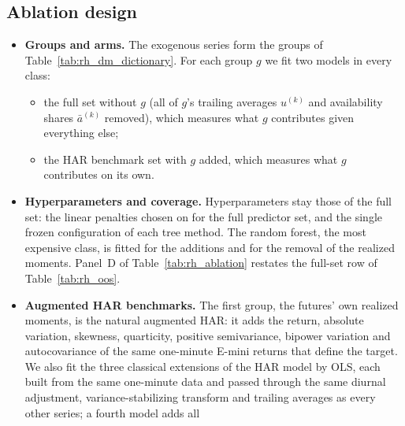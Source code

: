 \subsection{Ablation design}
\label{app:rh_results_ablation}
\begin{itemize}
\item \textbf{Groups and arms.} The \rhdmNSeriesPooled{} exogenous series form the \rhfiNBuckets{} groups of
  Table~\ref{tab:rh_dm_dictionary}. For each group $g$ we fit two models in every class:
  \begin{itemize}
  \item the full set without $g$ (all of $g$'s trailing averages $u^{(k)}$ and availability shares $\bar a^{(k)}$
    removed), which measures what $g$ contributes given everything else;
  \item the HAR benchmark set with $g$ added, which measures what $g$ contributes on its own.
  \end{itemize}
\item \textbf{Hyperparameters and coverage.} Hyperparameters stay those of the full set: the linear penalties chosen on
  \rhorPenSample{} for the full predictor set, and the single frozen configuration of each tree method. The random
  forest, the most expensive class, is fitted for the \rhfiNBuckets{} additions and for the removal of the realized
  moments. Panel~D of Table~\ref{tab:rh_ablation} restates the full-set row of Table~\ref{tab:rh_oos}.
\item \textbf{Augmented HAR benchmarks.} The first group, the futures' own realized moments, is the natural augmented
  HAR: it adds the return, absolute variation, skewness, quarticity, positive semivariance, bipower variation and
  autocovariance of the same one-minute E-mini returns that define the target. We also fit the three classical
  extensions of the HAR model by OLS, each built from the same one-minute data and passed through the same diurnal
  adjustment, variance-stabilizing transform and trailing averages as every other series; a fourth model adds all

\end{itemize}

